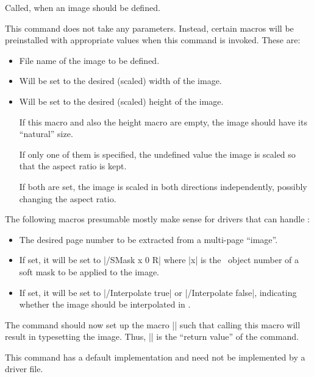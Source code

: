 \begin{command}{\pgfsys@defineimage}
    Called, when an image should be defined.

    This command does not take any parameters. Instead, certain macros will be
    preinstalled with appropriate values when this command is invoked. These
    are:
    \begin{itemize}
        \item{} File name of the image to be defined.
        \item{} Will be set to the desired (scaled)
            width of the image.
        \item{} Will be set to the desired (scaled)
            height of the image.

            If this macro and also the height macro are empty, the image should
            have its ``natural'' size.

            If only one of them is specified, the undefined value the image is
            scaled so that the aspect ratio is kept.

            If both are set, the image is scaled in both directions
            independently, possibly changing the aspect ratio.
    \end{itemize}

    The following macros presumable mostly make sense for drivers that
    can handle \pdf:
    \begin{itemize}
        \item {} The desired page number to be
            extracted from a multi-page ``image''.
        \item{} If set, it will be set to
            |/SMask x 0 R| where |x| is the \pdf\ object number of a soft mask
            to be applied to the image.
        \item{} If set, it will be set to
            |/Interpolate true| or |/Interpolate false|, indicating whether the
            image should be interpolated in \pdf.
    \end{itemize}

    The command should now set up the macro |\pgf@image| such that calling this
    macro will result in typesetting the image. Thus, |\pgf@image| is the
    ``return value'' of the command.

    This command has a default implementation and need not be implemented by a
    driver file.
\end{command}


